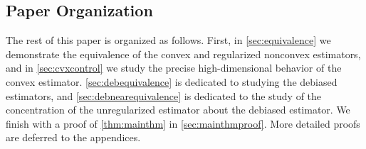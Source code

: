 \documentclass[10pt]{article}
\theoremstyle{definition}
\begin{document}
\subsection{Paper Organization}
The rest of this paper is organized as follows.  First, in \cref{sec:equivalence} we demonstrate the equivalence of the convex and regularized nonconvex estimators, and in \cref{sec:cvxcontrol} we study the precise high-dimensional behavior of the convex estimator. \cref{sec:debequivalence} is dedicated to studying the debiased estimators, and  \cref{sec:debnearequivalence} is dedicated to the study of the concentration of the unregularized estimator about the debiased estimator.  We finish with a proof of \cref{thm:mainthm} in \cref{sec:mainthmproof}.  More detailed proofs are deferred to the appendices.  
\end{document}
